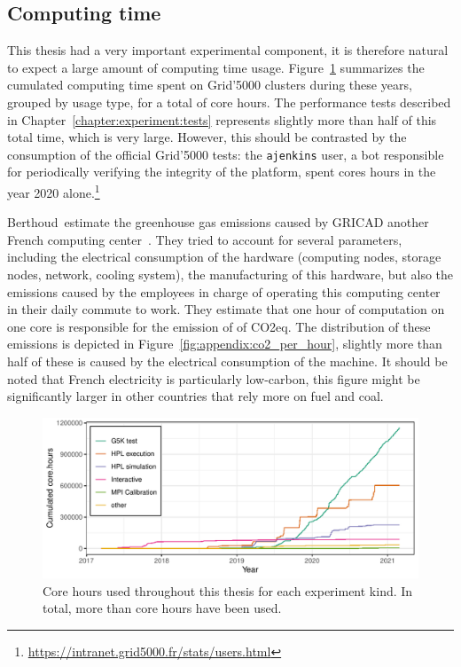    \subsection*{Computing time}%

        This thesis had a very important experimental component, it is therefore natural to expect a large amount of
        computing time usage. Figure~\ref{fig:appendix:node_hours} summarizes the cumulated computing time spent on
        Grid'5000 clusters during these years, grouped by usage type, for a total of  core hours. The
        performance tests described in Chapter~\ref{chapter:experiment:tests} represents slightly more than half of this
        total time, which is very large. However, this should be contrasted by the consumption of the official Grid'5000
        tests: the \texttt{ajenkins} user, a bot responsible for periodically verifying the integrity of the platform,
        spent  cores hours in the year 2020
        alone.\footnote{\url{https://intranet.grid5000.fr/stats/users.html}}

        Berthoud~\etal estimate the greenhouse gas emissions caused by GRICAD another French computing
        center~\cite{corehour_co2}. They tried to account for several parameters, including the electrical consumption
        of the hardware (computing nodes, storage nodes, network, cooling system), the manufacturing of this hardware,
        but also the emissions caused by the employees in charge of operating this computing center in their daily
        commute to work. They estimate that one hour of computation on one core is responsible for the emission of
         of CO2eq. The distribution of these emissions is depicted in
        Figure~\ref{fig:appendix:co2_per_hour}, slightly more than half of these  is caused by the
        electrical consumption of the machine. It should be noted that French electricity is particularly low-carbon,
        this figure might be significantly larger in other countries that rely more on fuel and coal.

        \begin{figure}[htpb]
            \centering
            \includegraphics[width=\linewidth]{img/appendix/carbon/node_hours.pdf}
            \caption{Core hours used throughout this thesis for each experiment kind. In total, more than
             core hours have been used.}%
            \label{fig:appendix:node_hours}
        \end{figure}

